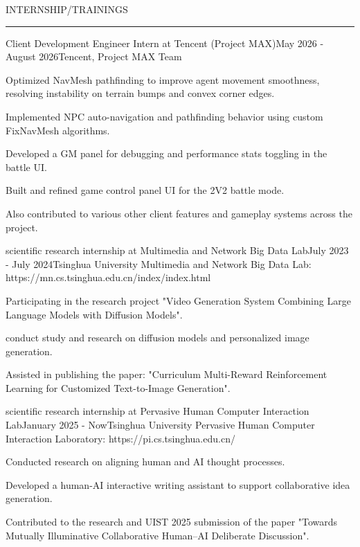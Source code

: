 \documentclass{resume} %
\renewenvironment{rSection}[1]{
\sectionskip
\textcolor{TsinghuaPurple}{\MakeUppercase{#1}}
\sectionlineskip
\hrule
\begin{list}{}{
\setlength{\leftmargin}{0em}
}
\item[]
}{
\end{list}
}
\begin{document}

\begin{rSection}{INTERNSHIP/TRAININGS}

\begin{rSubsection}{Client Development Engineer Intern at Tencent (Project MAX)}{May 2026 - August 2026}{Tencent, Project MAX Team}{}              
\item Optimized NavMesh pathfinding to improve agent movement smoothness, resolving instability on terrain bumps and convex corner edges.
\item Implemented NPC auto-navigation and pathfinding behavior using custom FixNavMesh algorithms.
\item Developed a GM panel for debugging and performance stats toggling in the battle UI.
\item Built and refined game control panel UI for the 2V2 battle mode.
\item Also contributed to various other client features and gameplay systems across the project.
\end{rSubsection}  

\begin{rSubsection}{scientific research internship at Multimedia and Network Big Data Lab}{July 2023 - July 2024}{Tsinghua University Multimedia and Network Big Data Lab: https://mn.cs.tsinghua.edu.cn/index/index.html}{}              
\item Participating in the research project "Video Generation System Combining Large Language Models with Diffusion Models".  
\item conduct study and research on diffusion models and personalized image generation.
\item Assisted in publishing the paper: "Curriculum Multi-Reward Reinforcement Learning for Customized Text-to-Image Generation".
\end{rSubsection}  

\begin{rSubsection}{scientific research internship at Pervasive Human Computer Interaction Lab}{January 2025 - Now}{Tsinghua University Pervasive Human Computer Interaction Laboratory: https://pi.cs.tsinghua.edu.cn/}{}              
\item Conducted research on aligning human and AI thought processes.
\item Developed a human-AI interactive writing assistant to support collaborative idea generation.
\item Contributed to the research and UIST 2025 submission of the paper "Towards Mutually Illuminative Collaborative Human–AI Deliberate Discussion".
\end{rSubsection}  


\end{rSection}
\end{document}
